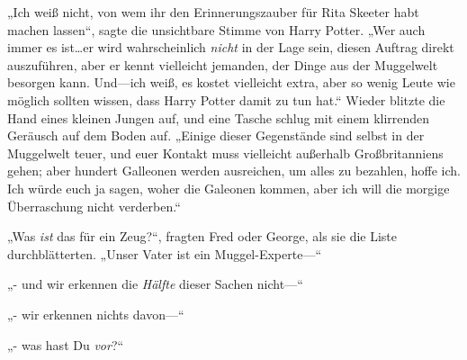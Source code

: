 „Ich weiß nicht, von wem ihr den Erinnerungszauber für Rita Skeeter habt machen lassen“, sagte die unsichtbare Stimme von Harry Potter. „Wer auch immer es ist…er wird wahrscheinlich \emph{nicht} in der Lage sein, diesen Auftrag direkt auszuführen, aber er kennt vielleicht jemanden, der Dinge aus der Muggelwelt besorgen kann. Und—ich weiß, es kostet vielleicht extra, aber so wenig Leute wie möglich sollten wissen, dass Harry Potter damit zu tun hat.“
Wieder blitzte die Hand eines kleinen Jungen auf, und eine Tasche schlug mit einem klirrenden Geräusch auf dem Boden auf.
„Einige dieser Gegenstände sind selbst in der Muggelwelt teuer, und euer Kontakt muss vielleicht außerhalb Großbritanniens gehen; aber hundert Galleonen werden ausreichen, um alles zu bezahlen, hoffe ich. Ich würde euch ja sagen, woher die Galeonen kommen, aber ich will die morgige Überraschung nicht verderben.“

„Was \emph{ist} das für ein Zeug?“, fragten Fred oder George, als sie die Liste durchblätterten.
„Unser Vater ist ein Muggel-Experte—“

„- und wir erkennen die \emph{Hälfte} dieser Sachen nicht—“

„- wir erkennen nichts davon—“

„- was hast Du \emph{vor}?“

